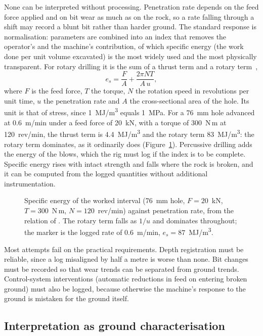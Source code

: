None can be interpreted without processing. Penetration rate depends on the feed force applied
and on bit wear as much as on the rock, so a rate falling through a shift may
record a blunt bit rather than harder ground. The standard response is
normalisation: parameters are combined into an index that removes the
operator's and the machine's contribution, of which specific energy (the
work done per unit volume excavated) is the most widely used and the most
physically transparent. For rotary drilling it is the sum of a thrust term
and a rotary term~\citep{teale1965specific},
\[
e_s = \frac{F}{A} + \frac{2\pi N T}{A\,u} ,
\]
where $F$ is the feed force, $T$ the torque, $N$ the rotation speed in
revolutions per unit time, $u$ the penetration rate and $A$ the
cross-sectional area of the hole. Its unit is that of stress, since
1~MJ/m\textsuperscript{3} equals 1~MPa. For a 76~mm hole advanced at
0.6~m/min under a feed force of 20~kN, with a torque of 300~N\,m at
120~rev/min, the thrust term is 4.4~MJ/m\textsuperscript{3} and the rotary
term 83~MJ/m\textsuperscript{3}: the rotary term dominates, as it ordinarily
does (Figure~\ref{fig:mwd-specific-energy}). Percussive drilling adds the energy of the blows, which the rig must
log if the index is to be complete. Specific energy rises with intact
strength and falls where the rock is broken, and it can be computed from the
logged quantities without additional instrumentation.

\begin{figure}[htbp]
\centering
{}
\caption{Specific energy of the worked interval (76~mm hole, $F = 20$~kN, $T = 300$~N\,m, $N = 120$~rev/min) against penetration rate, from the relation of \citet{teale1965specific}. The rotary term falls as $1/u$ and dominates throughout; the marker is the logged rate of 0.6~m/min, $e_s = 87$~MJ/m\textsuperscript{3}.}
\label{fig:mwd-specific-energy}
\end{figure}

Most attempts fail on the practical requirements.
Depth registration must be reliable, since a log misaligned by half a metre is
worse than none. Bit changes must be recorded so that wear trends can be
separated from ground trends. Control-system interventions (automatic
reductions in feed on entering broken ground) must also be logged, because
otherwise the machine's response to the ground is mistaken for the ground
itself.

\subsection{Interpretation as ground characterisation}
\label{sec:mwd-interpretation}

